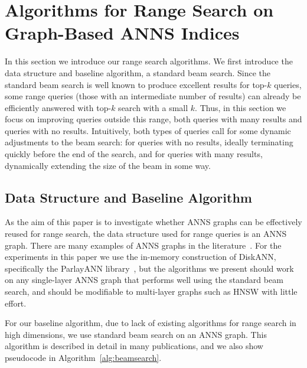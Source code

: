 \section{Algorithms for Range Search on Graph-Based ANNS Indices}\label{sec:algorithms}

In this section we introduce our range search algorithms. We first introduce the data structure and baseline algorithm, a standard beam search. Since the standard beam search is well known to produce excellent results for top-$k$ queries, some range queries (those with an intermediate number of results) can already be efficiently answered with top-$k$ search with a small $k$. Thus, in this section we focus on improving queries outside this range, both queries with many results and queries with no results. Intuitively, both types of queries call for some dynamic adjustments to the beam search: for queries with no results, ideally terminating quickly before the end of the search, and for queries with many results, dynamically extending the size of the beam in some way. 

\subsection{Data Structure and Baseline Algorithm}

As the aim of this paper is to investigate whether ANNS graphs can be effectively reused for range search, the data structure used for range queries is an ANNS graph. There are many examples of ANNS graphs in the literature~\cite{subramanya2019diskann,fu2019nsg,malkov2018efficient}. For the experiments in this paper we use the in-memory construction of DiskANN, specifically the ParlayANN library~\cite{manohar2024parlayann}, but the algorithms we present should work on any single-layer ANNS graph that performs well using the standard beam search, and should be modifiable to multi-layer graphs such as HNSW with little effort.

For our baseline algorithm, due to lack of existing algorithms for range search in high dimensions, we use standard beam search on an ANNS graph. This algorithm is described in detail in many publications, and we also show pseudocode in Algorithm~\ref{alg:beamsearch}. 


